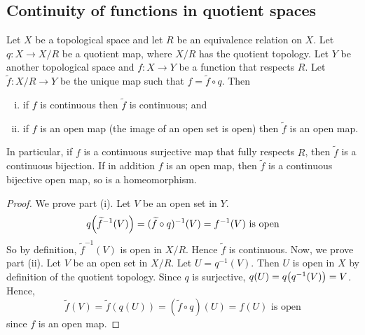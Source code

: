 \subsection{Continuity of functions in quotient spaces}
\begin{proposition}
	Let \( X \) be a topological space and let \( R \) be an equivalence relation on \( X \).
	Let \( q \colon X \to X/R \) be a quotient map, where \( X/R \) has the quotient topology.
	Let \( Y \) be another topological space and \( f \colon X \to Y \) be a function that respects \( R \).
	Let \( \widetilde f \colon X/R \to Y \) be the unique map such that \( f = \widetilde f \circ q \).
	Then
	\begin{enumerate}[(i)]
		\item if \( f \) is continuous then \( \widetilde f \) is continuous; and
		\item if \( f \) is an open map (the image of an open set is open) then \( \widetilde f \) is an open map.
	\end{enumerate}
	In particular, if \( f \) is a continuous surjective map that fully respects \( R \), then \( \widetilde f \) is a continuous bijection.
	If in addition \( f \) is an open map, then \( \widetilde f \) is a continuous bijective open map, so is a homeomorphism.
\end{proposition}
\begin{proof}
	We prove part (i).
	Let \( V \) be an open set in \( Y \).
	\[
		q\qty(\widetilde f^{-1}(V)) = (\widetilde f \circ q)^{-1}(V) = f^{-1}(V) \text{ is open}
	\]
	So by definition, \( \widetilde f^{-1}(V) \) is open in \( X/R \).
	Hence \( \widetilde f \) is continuous.
	Now, we prove part (ii).
	Let \( V \) be an open set in \( X/R \).
	Let \( U = q^{-1}(V) \).
	Then \( U \) is open in \( X \) by definition of the quotient topology.
	Since \( q \) is surjective, \( q(U) = q\qty(q^{-1}(V)) = V \).
	Hence,
	\[
		\widetilde f(V) = \widetilde f(q(U)) = (\widetilde f \circ q)(U) = f(U) \text{ is open}
	\]
	since \( f \) is an open map.
\end{proof}
